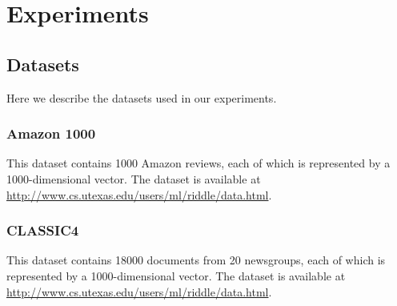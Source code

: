 
\section{Experiments}
\label{sec:experiment}

\subsection{Datasets}

Here we describe the datasets used in our experiments.

\subsubsection{Amazon 1000}

This dataset contains 1000 Amazon reviews, each of which is represented by a 1000-dimensional vector. The dataset is available at \url{http://www.cs.utexas.edu/users/ml/riddle/data.html}.

\subsubsection{CLASSIC4}

This dataset contains 18000 documents from 20 newsgroups, each of which is represented by a 1000-dimensional vector. The dataset is available at \url{http://www.cs.utexas.edu/users/ml/riddle/data.html}.


